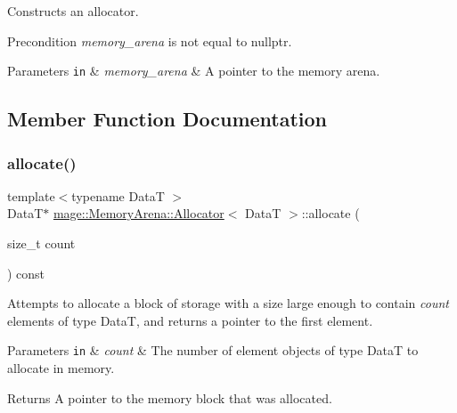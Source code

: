 Constructs an allocator.

\begin{DoxyPrecond}{Precondition}
{\itshape memory\+\_\+arena} is not equal to {\ttfamily nullptr}. 
\end{DoxyPrecond}

\begin{DoxyParams}[1]{Parameters}
\mbox{\tt in}  & {\em memory\+\_\+arena} & A pointer to the memory arena. \\
\hline
\end{DoxyParams}


\subsection{Member Function Documentation}
\hypertarget{structmage_1_1_memory_arena_1_1_allocator_a46d428590d87f47742abc173858ccc95}{}\label{structmage_1_1_memory_arena_1_1_allocator_a46d428590d87f47742abc173858ccc95} 
\subsubsection{\texorpdfstring{allocate()}{allocate()}\hspace{0.1cm}{\footnotesize\ttfamily [1/2]}}
{\footnotesize\ttfamily template$<$typename DataT $>$ \\
DataT$\ast$ \hyperlink{structmage_1_1_memory_arena_1_1_allocator}{mage\+::\+Memory\+Arena\+::\+Allocator}$<$ DataT $>$\+::allocate (\begin{DoxyParamCaption}\item[{size\+\_\+t}]{count }\end{DoxyParamCaption}) const}

Attempts to allocate a block of storage with a size large enough to contain {\itshape count} elements of type {\ttfamily DataT}, and returns a pointer to the first element.


\begin{DoxyParams}[1]{Parameters}
\mbox{\tt in}  & {\em count} & The number of element objects of type {\ttfamily DataT} to allocate in memory. \\
\hline
\end{DoxyParams}
\begin{DoxyReturn}{Returns}
A pointer to the memory block that was allocated. 
\end{DoxyReturn}

